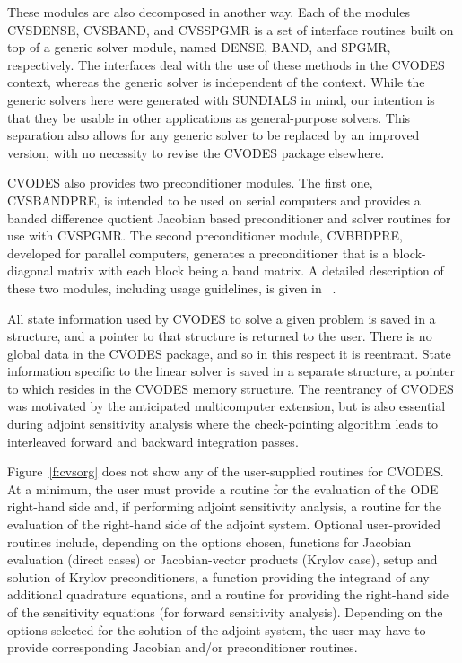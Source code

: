 These modules are also decomposed in another way.
Each of the modules CVSDENSE, CVSBAND, and CVSSPGMR is a set of 
interface routines built on top of a generic solver module, 
named DENSE, BAND, and SPGMR, respectively.  
The interfaces deal with the use of these methods in the CVODES context, 
whereas the generic solver is independent of the context.
While the generic solvers here were generated with SUNDIALS in mind, our
intention is that they be usable in other applications as
general-purpose solvers.  This separation also allows for any generic
solver to be replaced by an improved version, with no necessity to
revise the CVODES package elsewhere.

CVODES also provides two preconditioner modules. The first one, 
CVSBANDPRE, is intended to be used on serial computers and provides
a banded difference quotient Jacobian based preconditioner and solver
routines for use with CVSPGMR. The second preconditioner module, 
CVBBDPRE, developed for parallel computers, generates a 
preconditioner that is a block-diagonal matrix with each block being 
a band matrix. A detailed description of these two modules, including
usage guidelines, is given in ~\cite{HBGLSSW:03}.

All state information used by CVODES to solve a given problem is saved
in a structure, and a pointer to that structure is returned to the
user.  There is no global data in the CVODES package, and so in this
respect it is reentrant. State information specific to the linear
solver is saved in a separate structure, a pointer to which resides in
the CVODES memory structure. The reentrancy of CVODES was motivated
by the anticipated multicomputer extension, but is also essential
during adjoint sensitivity analysis where the check-pointing algorithm
leads to interleaved forward and backward integration passes. 

Figure~\ref{f:cvsorg} does not show any of the user-supplied routines 
for CVODES. At a minimum, the user must provide a routine for the evaluation 
of the ODE right-hand side and, if performing adjoint sensitivity analysis,
a routine for the evaluation of the right-hand side of the adjoint system. 
Optional user-provided routines include, depending on the options chosen, 
functions for Jacobian evaluation (direct cases) or Jacobian-vector products 
(Krylov case), setup and solution of Krylov preconditioners, a function providing 
the integrand of any additional quadrature equations, and a routine for
providing the right-hand side of the sensitivity equations (for forward sensitivity
analysis). Depending on the options selected for the solution of the adjoint
system, the user may have to provide corresponding Jacobian and/or preconditioner
routines.


